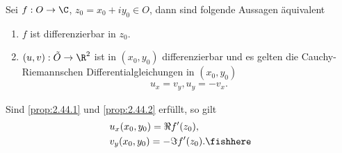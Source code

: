   \begin{prop}
  \label{prop:2.44}
  Sei $f:O\to\C$, $z_0 = x_0+iy_0\in O$, dann sind folgende Aussagen äquivalent
  \begin{enumerate}[label=(\roman{*})]
    \item\label{prop:2.44.1} $f$ ist differenzierbar in $z_0$.
    \item\label{prop:2.44.2} $(u,v): \tilde{O}\to\R^2$ ist in $(x_0,y_0)$
    differenzierbar und es gelten die Cauchy-Riemannschen Differentialgleichungen in $(x_0,y_0)$
    \begin{align*}
    u_x = v_y, u_y = -v_x.
    \end{align*}
  \end{enumerate}
  Sind \ref{prop:2.44.1} und \ref{prop:2.44.2} erfüllt, so gilt
  \begin{align*}
  &u_x(x_0,y_0) = \Re f'(z_0),\\
  &v_y(x_0,y_0) = -\Im f'(z_0).\fishhere
  \end{align*}
  \end{prop}

